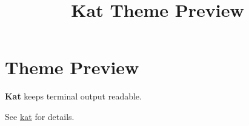 \documentclass{article}
\title{Kat Theme Preview}
\begin{document}
\section{Theme Preview}\label{sec:theme}
\textbf{Kat} keeps terminal output readable.

See \href{https://example.com/kat}{kat} for details.
\end{document}
